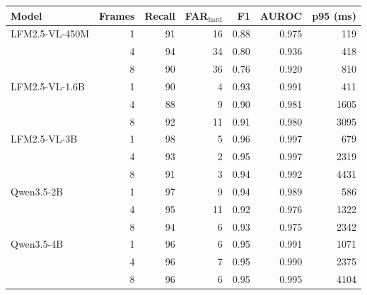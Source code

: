 \begin{tabular}{lrrrrrr}
\toprule
Model & Frames & Recall & FAR$_\text{hard}$ & F1 & AUROC & p95 (ms) \\
\midrule
LFM2.5-VL-450M & 1 & 91 & 16 & 0.88 & 0.975 & 119 \\
 & 4 & 94 & 34 & 0.80 & 0.936 & 418 \\
 & 8 & 90 & 36 & 0.76 & 0.920 & 810 \\
\midrule
LFM2.5-VL-1.6B & 1 & 90 & 4 & 0.93 & 0.991 & 411 \\
 & 4 & 88 & 9 & 0.90 & 0.981 & 1605 \\
 & 8 & 92 & 11 & 0.91 & 0.980 & 3095 \\
\midrule
LFM2.5-VL-3B & 1 & 98 & 5 & 0.96 & 0.997 & 679 \\
 & 4 & 93 & 2 & 0.95 & 0.997 & 2319 \\
 & 8 & 91 & 3 & 0.94 & 0.992 & 4431 \\
\midrule
Qwen3.5-2B & 1 & 97 & 9 & 0.94 & 0.989 & 586 \\
 & 4 & 95 & 11 & 0.92 & 0.976 & 1322 \\
 & 8 & 94 & 6 & 0.93 & 0.975 & 2342 \\
\midrule
Qwen3.5-4B & 1 & 96 & 6 & 0.95 & 0.991 & 1071 \\
 & 4 & 96 & 7 & 0.95 & 0.990 & 2375 \\
 & 8 & 96 & 6 & 0.95 & 0.995 & 4104 \\
\bottomrule
\end{tabular}
